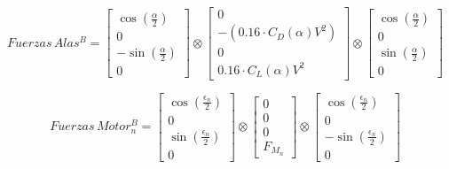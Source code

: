 \documentclass{article}
\begin{document}
\[
  Fuerzas\,Alas^B = \begin{bmatrix}
                      \cos\!\left( \tfrac{\alpha}{2} \right)  \\[6pt]
                      0                                       \\[6pt]
                      -\sin\!\left( \tfrac{\alpha}{2} \right) \\[6pt]
                      0
                    \end{bmatrix}
  \otimes \begin{bmatrix}
            0                             \\[6pt]
            - (0.16 \cdot C_D(\alpha)V^2) \\[6pt]
            0                             \\[6pt]
            0.16 \cdot C_L(\alpha)V^2
          \end{bmatrix}
  \otimes \begin{bmatrix}
            \cos\!\left( \tfrac{\alpha}{2} \right) \\[6pt]
            0                                      \\[6pt]
            \sin\!\left( \tfrac{\alpha}{2} \right) \\[6pt]
            0
          \end{bmatrix}
\]

\[
  Fuerzas\,Motor_n^B = \begin{bmatrix}
                         \cos\!\left( \tfrac{\epsilon_n}{2} \right) \\[6pt]
                         0                                          \\[6pt]
                         \sin\!\left( \tfrac{\epsilon_n}{2} \right) \\[6pt]
                         0
                       \end{bmatrix}
  \otimes \begin{bmatrix}
            0         \\[6pt]
            0         \\[6pt]
            0         \\[6pt]
            F_{M_{n}}
          \end{bmatrix}
  \otimes \begin{bmatrix}
            \cos(\tfrac{\epsilon_n}{2})  \\[6pt]
            0                            \\[6pt]
            -\sin(\tfrac{\epsilon_n}{2}) \\[6pt]
            0
          \end{bmatrix}
\]
\end{document}
